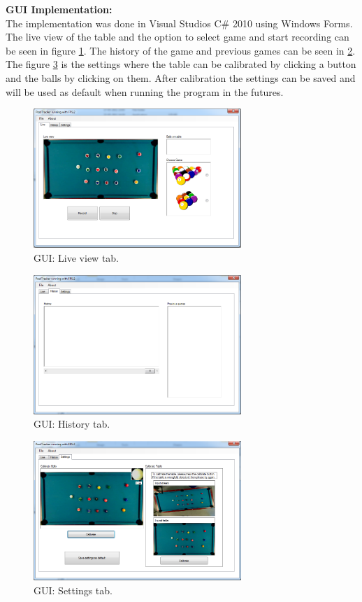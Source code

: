 \textbf{GUI Implementation:}\\
The implementation was done in Visual Studios C\# 2010 using Windows Forms. The live view of the table and the option to select game and start recording can be seen in figure \ref{fig:guilive}. The history of the game and previous games can be seen in \ref{fig:guihist}. The figure \ref{fig:guisett} is the settings where the table can be calibrated by clicking a button and the balls by clicking on them. After calibration the settings can be saved and will be used as default when running the program in the futures.

\begin{figure}[H]
\begin{center}
\leavevmode
\includegraphics[width=0.7\textwidth]{images/prototype/live}
\end{center}
\caption{GUI: Live view tab.}
\label{fig:guilive}
\end{figure}

\begin{figure}[H]
\begin{center}
\leavevmode
\includegraphics[width=0.7\textwidth]{images/prototype/hist}
\end{center}
\caption{GUI: History tab.}
\label{fig:guihist}
\end{figure}

\begin{figure}[H]
\begin{center}
\leavevmode
\includegraphics[width=0.7\textwidth]{images/prototype/settings}
\end{center}
\caption{GUI: Settings tab.}
\label{fig:guisett}
\end{figure}